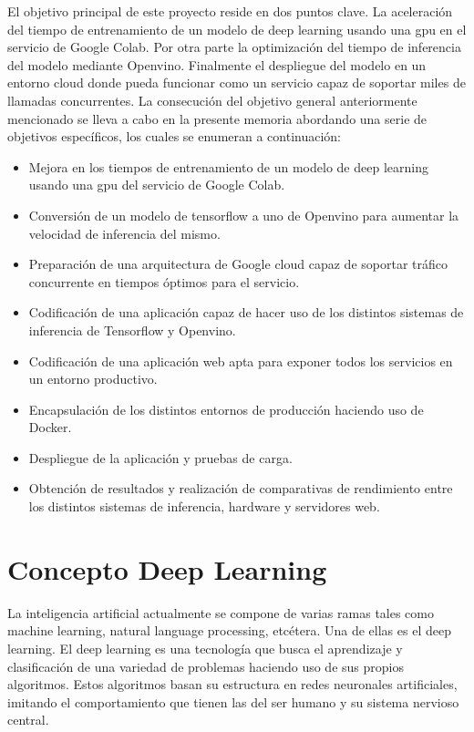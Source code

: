 El objetivo principal de este proyecto reside en dos puntos clave.
La aceleración del tiempo de entrenamiento de un modelo de deep learning usando una gpu en el servicio de Google Colab.
Por otra parte la optimización del tiempo de inferencia del modelo mediante Openvino.
Finalmente el despliegue del modelo en un entorno cloud donde pueda funcionar como un servicio capaz de soportar miles de llamadas concurrentes.
La consecución del objetivo general anteriormente mencionado se lleva a cabo en la
presente memoria abordando una serie de objetivos específicos, los cuales se enumeran a
continuación:
\begin{itemize}
    \item Mejora en los tiempos de entrenamiento de un modelo de deep learning usando una gpu del servicio de Google Colab.
    \item Conversión de un modelo de tensorflow a uno de Openvino para aumentar la velocidad de inferencia del mismo.
    \item Preparación de una arquitectura de Google cloud capaz de soportar tráfico concurrente en tiempos óptimos para el servicio.
    \item Codificación de una aplicación capaz de hacer uso de los distintos sistemas de inferencia de Tensorflow y Openvino.
    \item Codificación de una aplicación web apta para exponer todos los servicios en un entorno productivo.
    \item Encapsulación de los distintos entornos de producción haciendo uso de Docker.
    \item Despliegue de la aplicación y pruebas de carga.
    \item Obtención de resultados y realización de comparativas de rendimiento entre los distintos sistemas de inferencia, hardware y servidores web.
\end{itemize}


\section{Concepto Deep Learning}\label{sec:concepto-deep-learning}
La inteligencia artificial actualmente se compone de varias ramas tales como machine learning, natural language processing, etcétera.
Una de ellas es el deep learning.
El deep learning es una tecnología que busca el aprendizaje y clasificación de una variedad de problemas haciendo uso de sus propios algoritmos.
Estos algoritmos basan su estructura en redes neuronales artificiales, imitando el comportamiento que tienen las del ser humano y su sistema nervioso central.



